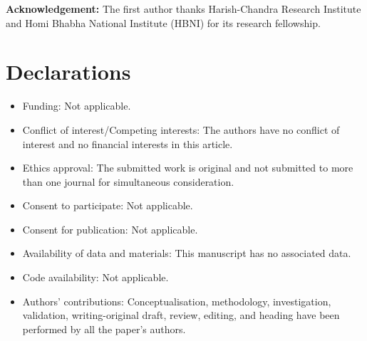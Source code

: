 \documentclass{amsart}
\theoremstyle{plain}
\theoremstyle{plain}
\theoremstyle{plain}
\theoremstyle{plain}
\theoremstyle{remark}
\begin{document}
\printbibliography

\vspace{1in}

\noindent
{\bf Acknowledgement:} The first author thanks Harish-Chandra Research Institute and Homi Bhabha National Institute (HBNI) for its research fellowship.

\section{Declarations}
	
	\begin{itemize}
		\item Funding: Not applicable. 
		
		\item Conflict of interest/Competing interests: The authors have no conflict of interest and no financial interests in this article.
		
		\item Ethics approval: The submitted work is original and not submitted to more than one journal for simultaneous consideration.
		
		\item Consent to participate: Not applicable.
		
		\item Consent for publication: Not applicable.
		
		\item Availability of data and materials: This manuscript has no associated data.
		
		\item Code availability: Not applicable.
		
		\item Authors' contributions: Conceptualisation, methodology, investigation, validation, writing-original draft, review, editing, and heading have been performed by all the paper's authors.
		
	\end{itemize}
\end{document}
